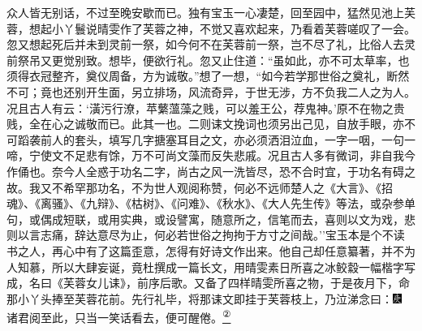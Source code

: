 众人皆无别话，不过至晚安歇而已。独有宝玉一心凄楚，回至园中，猛然见池上芙蓉，想起小丫鬟说晴雯作了芙蓉之神，不觉又喜欢起来，乃看着芙蓉嗟叹了一会。忽又想起死后并未到灵前一祭，如今何不在芙蓉前一祭，岂不尽了礼，比俗人去灵前祭吊又更觉别致。想毕，便欲行礼。忽又止住道：``虽如此，亦不可太草率，也须得衣冠整齐，奠仪周备，方为诚敬。''想了一想，``如今若学那世俗之奠礼，断然不可；竟也还别开生面，另立排场，风流奇异，于世无涉，方不负我二人之为人。况且古人有云：`潢污行潦，苹蘩薀藻之贱，可以羞王公，荐鬼神。'原不在物之贵贱，全在心之诚敬而已。此其一也。二则诔文挽词也须另出己见，自放手眼，亦不可蹈袭前人的套头，填写几字搪塞耳目之文，亦必须洒泪泣血，一字一咽，一句一啼，宁使文不足悲有馀，万不可尚文藻而反失悲戚。况且古人多有微词，非自我今作俑也。奈今人全惑于功名二字，尚古之风一洗皆尽，恐不合时宜，于功名有碍之故。我又不希罕那功名，不为世人观阅称赞，何必不远师楚人之《大言》、《招魂》、《离骚》、《九辩》、《枯树》、《问难》、《秋水》、《大人先生传》等法，或杂参单句，或偶成短联，或用实典，或设譬寓，随意所之，信笔而去，喜则以文为戏，悲则以言志痛，辞达意尽为止，何必若世俗之拘拘于方寸之间哉。''宝玉本是个不读书之人，再心中有了这篇歪意，怎得有好诗文作出来。他自己却任意纂著，并不为人知慕，所以大肆妄诞，竟杜撰成一篇长文，用晴雯素日所喜之冰鲛縠一幅楷字写成，名曰《芙蓉女儿诔》，前序后歌。又备了四样晴雯所喜之物，于是夜月下，命那小丫头捧至芙蓉花前。先行礼毕，将那诔文即挂于芙蓉枝上，乃泣涕念曰：{\includegraphics[width=3mm]{../Images/00004}  \kaishu 诸君阅至此，只当一笑话看去，便可醒倦。}\href{../Text/part0082_split_000.html\#lnkback_2_a}{\textsuperscript{②}}

